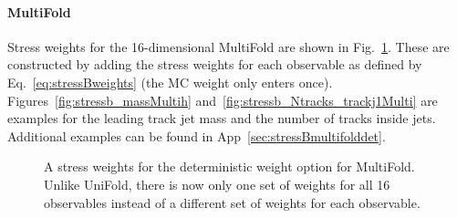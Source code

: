 \clearpage

\paragraph{MultiFold} Stress weights for the 16-dimensional MultiFold are shown in Fig.~\ref{fig:stressb_weightsMulti}.  These are constructed by adding the stress weights for each observable as defined by Eq.~\ref{eq:stressBweights} (the MC weight only enters once).  Figures~\ref{fig:stressb_massMultih} and~\ref{fig:stressb_Ntracks_trackj1Multi} are examples for the leading track jet mass and the number of tracks inside jets.  Additional examples can be found in App~\ref{sec:stressBmultifolddet}.

\begin{figure}[h!]
\centering
{}
\caption{A stress weights for the deterministic weight option for MultiFold.  Unlike UniFold, there is now only one set of weights for all 16 observables instead of a different set of weights for each observable.}
\label{fig:stressb_weightsMulti}
\end{figure}

